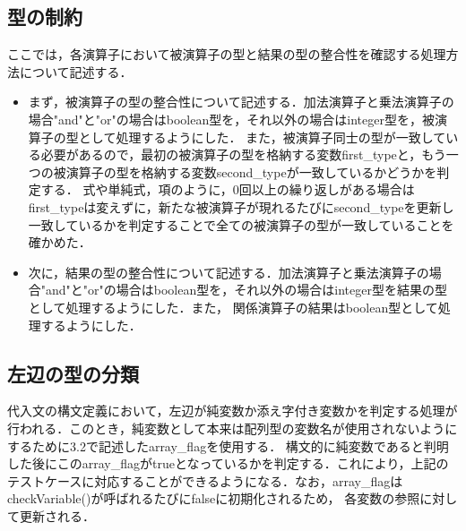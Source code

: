\documentclass[dvipdfmx]{jarticle}
\begin{document}
\subsection{型の制約}
ここでは，各演算子において被演算子の型と結果の型の整合性を確認する処理方法について記述する．
\begin{itemize}
  \item まず，被演算子の型の整合性について記述する．加法演算子と乗法演算子の場合"and"と"or"の場合はboolean型を，それ以外の場合はinteger型を，被演算子の型として処理するようにした．
  また，被演算子同士の型が一致している必要があるので，最初の被演算子の型を格納する変数first\_typeと，もう一つの被演算子の型を格納する変数second\_typeが一致しているかどうかを判定する．
  式や単純式，項のように，0回以上の繰り返しがある場合はfirst\_typeは変えずに，新たな被演算子が現れるたびにsecond\_typeを更新し一致しているかを判定することで全ての被演算子の型が一致していることを確かめた．
  
  \item 次に，結果の型の整合性について記述する．加法演算子と乗法演算子の場合"and"と"or"の場合はboolean型を，それ以外の場合はinteger型を結果の型として処理するようにした．また，
  関係演算子の結果はboolean型として処理するようにした．
\end{itemize}
\subsection{左辺の型の分類}
代入文の構文定義において，左辺が純変数か添え字付き変数かを判定する処理が行われる．このとき，純変数として本来は配列型の変数名が使用されないようにするために3.2で記述したarray\_flagを使用する．
構文的に純変数であると判明した後にこのarray\_flagがtrueとなっているかを判定する．これにより，上記のテストケースに対応することができるようになる．なお，array\_flagはcheckVariable()が呼ばれるたびにfalseに初期化されるため，
各変数の参照に対して更新される．
\end{document}
